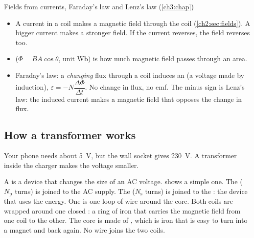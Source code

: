 \begin{refresher}{Fields from currents, Faraday's law and Lenz's law (\cref{ch3:chap})}
\begin{itemize}
  \item A current in a coil makes a magnetic field through the coil
        (\cref{ch2:sec:fields}). A bigger current makes a stronger field. If the current
        reverses, the field reverses too.
  \item {} ($\Phi = BA\cos\theta$, unit \si{Wb}) is how much magnetic
        field passes through an area.
  \item Faraday's law: a \emph{changing} flux through a coil induces an  (a
        voltage made by induction), $\varepsilon = -N\dfrac{\Delta\Phi}{\Delta t}$. No
        change in flux, no emf. The minus sign is Lenz's law: the induced current makes a
        magnetic field that opposes the change in flux.
\end{itemize}
\end{refresher}

\subsection{How a transformer works}

Your phone needs about \qty{5}{V}, but the wall socket gives \qty{230}{V}. A transformer
inside the charger makes the voltage smaller.

A  is a device that changes the size of an AC voltage.
 shows a simple one. The 
($N_\mathrm{p}$ turns) is joined to the AC supply. The 
($N_\mathrm{s}$ turns) is joined to the : the device that uses the energy.
One  is one loop of wire around the core. Both coils are wrapped around one
closed : a ring of iron that carries the magnetic field from one coil to the
other. The core is made of , which is iron that is easy to turn into a
magnet and back again. No wire joins the two coils.

